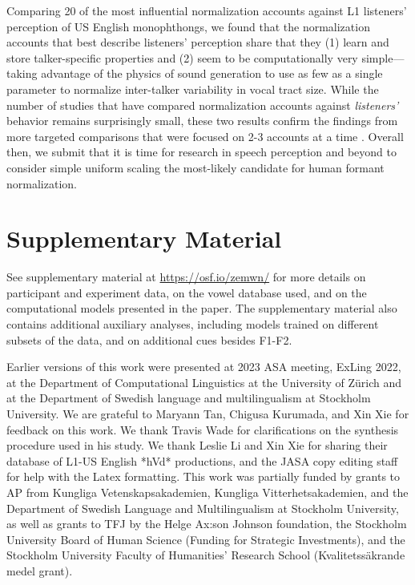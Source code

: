 \documentclass[preprint]{JASA}
\begin{document}
Comparing 20 of the most influential normalization accounts against L1 listeners' perception of US English monophthongs, we found that the normalization accounts that best describe listeners' perception share that they (1) learn and store talker-specific properties and (2) seem to be computationally very simple---taking advantage of the physics of sound generation to use as few as a single parameter to normalize inter-talker variability in vocal tract size. While the number of studies that have compared normalization accounts against \emph{listeners'} behavior remains surprisingly small, these two results confirm the findings from more targeted comparisons that were focused on 2-3 accounts at a time \citep{barreda2021, nearey1989, richter2017}. Overall then, we submit that it is time for research in speech perception and beyond to consider simple uniform scaling the most-likely candidate for human formant normalization.

\section*{Supplementary Material}\label{supplementary-material}

See supplementary material at \url{https://osf.io/zemwn/} for more details on participant and experiment data, on the vowel database used, and on the computational models presented in the paper. The supplementary material also contains additional auxiliary analyses, including models trained on different subsets of the data, and on additional cues besides F1-F2.

\begin{acknowledgments}
Earlier versions of this work were presented at 2023 ASA meeting, ExLing 2022, at the Department of Computational Linguistics at the University of Zürich and at the Department of Swedish language and multilingualism at Stockholm University. We are grateful to Maryann Tan, Chigusa Kurumada, and Xin Xie for feedback on this work. We thank Travis Wade for clarifications on the synthesis procedure used in his study. We thank Leslie Li and Xin Xie for sharing their database of L1-US English *hVd* productions, and the JASA copy editing staff for help with the Latex formatting. This work was partially funded by grants to AP from Kungliga Vetenskapsakademien, Kungliga Vitterhetsakademien, and the Department of Swedish Language and Multilingualism at Stockholm University, as well as grants to TFJ by the Helge Ax:son Johnson foundation, the Stockholm University Board of Human Science (Funding for Strategic Investments), and the Stockholm University Faculty of Humanities’ Research School (Kvalitetssäkrande medel grant).
\end{acknowledgments}
\end{document}
